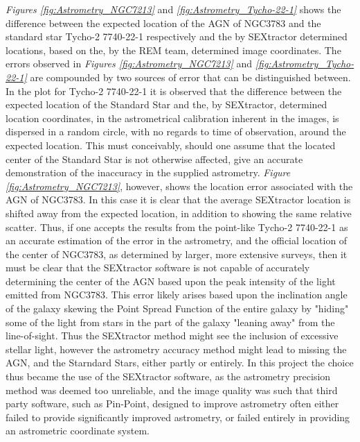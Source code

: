 \documentclass[a4paper, 12pt, twoside]{article}
\begin{document}
\emph{Figures \ref{fig:Astrometry_NGC7213}} and \emph{\ref{fig:Astrometry_Tycho-22-1}} shows the difference between the expected location of the AGN of NGC3783 and the standard star Tycho-2 7740-22-1 respectively and the by SEXtractor determined locations, based on the, by the REM team, determined image coordinates. The errors observed in \emph{Figures \ref{fig:Astrometry_NGC7213}} and \emph{\ref{fig:Astrometry_Tycho-22-1}} are compounded by two sources of error that can be distinguished between. In the plot for Tycho-2 7740-22-1 it is observed that the difference between the expected location of the Standard Star and the, by SEXtractor, determined location coordinates, in the astrometrical calibration inherent in the images, is dispersed in a random circle, with no regards to time of observation, around the expected location. This must conceivably, should one assume that the located center of the Standard Star is not otherwise affected, give an accurate demonstration of the inaccuracy in the supplied astrometry. \emph{Figure \ref{fig:Astrometry_NGC7213}}, however, shows the location error associated with the AGN of NGC3783. In this case it is clear that the average SEXtractor location is shifted away from the expected location, in addition to showing the same relative scatter. Thus, if one accepts the results from the point-like Tycho-2 7740-22-1 as an accurate estimation of the error in the astrometry, and the official location of the center of NGC3783, as determined by larger, more extensive surveys, then it must be clear that the SEXtractor software is not capable of accurately determining the center of the AGN based upon the peak intensity of the light emitted from NGC3783. This error likely arises based upon the inclination angle of the galaxy skewing the Point Spread Function of the entire galaxy by "hiding" some of the light from stars in the part of the galaxy "leaning away" from the line-of-sight. Thus the SEXtractor method might see the inclusion of excessive stellar light, however the astrometry accuracy method might lead to missing the AGN, and the Starndard Stars, either partly or entirely. In this project the choice thus became the use of the SEXtractor software, as the astrometry precision method was deemed too unreliable, and the image quality was such that third party software, such as Pin-Point, designed to improve astrometry often either failed to provide significantly improved astrometry, or failed entirely in providing an astrometric coordinate system. 
\end{document}
